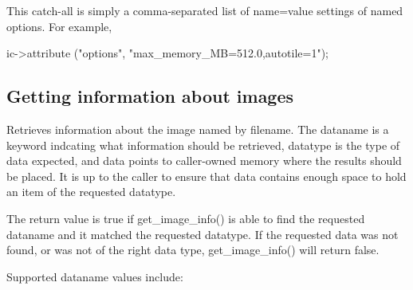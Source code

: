This catch-all is simply a comma-separated list of {\cf name=value}
settings of named options.  For example,
\begin{code}
        ic->attribute ("options", "max_memory_MB=512.0,autotile=1");
\end{code}
\apiend

\bigskip

\subsection{Getting information about images}
\label{sec:imagecache:api:getimageinfo}
\label{sec:imagecache:api:getimagespec}

Retrieves information about the image named by {\cf filename}.
The {\cf dataname} is a keyword indcating what information should
be retrieved, {\cf datatype} is the type of data expected, and
{\cf data} points to caller-owned memory where the results should be
placed.  It is up to the caller to ensure that {\cf data} contains
enough space to hold an item of the requested {\cf datatype}.

The return value is {\cf true} if {\cf get_image_info()} is able
to find the requested {\cf dataname} and it matched the requested
{\cf datatype}.  If the requested data was not found, or was not
of the right data type, {\cf get_image_info()} will return {\cf false}.

Supported {\cf dataname} values include:


